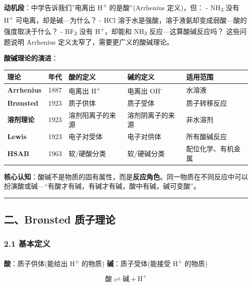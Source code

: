 \documentclass[a4paper,11pt]{ctexart}
\newcounter{none}
\begin{document}
\textbf{动机段}：中学告诉我们''电离出 H\textsuperscript{+} 的是酸''(Arrhenius 定义)，但：
- NH\textsubscript{3} 没有 H\textsuperscript{+} 可电离，却是碱---为什么？
- HCl 溶于水是强酸，溶于液氨却变成弱酸---酸的强度取决于什么？
- BF\textsubscript{3} 没有 H\textsuperscript{+}，却能和 NH\textsubscript{3} 反应---这算酸碱反应吗？
这些问题说明 Arrhenius 定义太窄了，需要更广义的酸碱理论。

\textbf{酸碱理论的演进}：

{\def\LTcaptype{none} %
\begin{longtable}[]{@{}lclll@{}}
\toprule\noalign{}
理论 & 年代 & 酸的定义 & 碱的定义 & 适用范围 \\
\midrule\noalign{}
\endhead
\bottomrule\noalign{}
\endlastfoot
\textbf{Arrhenius} & 1887 & 电离出 H\textsuperscript{+} & 电离出 OH\textsuperscript{-} & 水溶液 \\
\textbf{Brønsted} & 1923 & 质子供体 & 质子受体 & 质子转移反应 \\
\textbf{溶剂理论} & 1923 & 溶剂阳离子的来源 & 溶剂阴离子的来源 & 非水溶剂 \\
\textbf{Lewis} & 1923 & 电子对受体 & 电子对供体 & 所有酸碱反应 \\
\textbf{HSAB} & 1963 & 软/硬酸分类 & 软/硬碱分类 & 配位化学、有机金属 \\
\end{longtable}
}

\textbf{核心认知}：酸碱不是物质的固有属性，而是\textbf{反应角色}。同一物质在不同反应中可以扮演酸或碱---``有酸才有碱，有碱才有碱，酸中有碱，碱可变酸''。

\begin{center}\rule{0.5\linewidth}{0.5pt}\end{center}

\subsection{二、Brønsted 质子理论}\label{ux4e8cbruxf8nsted-ux8d28ux5b50ux7406ux8bba}

\subsubsection{2.1 基本定义}\label{ux57faux672cux5b9aux4e49}

\textbf{酸}：质子供体(能给出 H\textsuperscript{+} 的物质)
\textbf{碱}：质子受体(能接受 H\textsuperscript{+} 的物质)

\[
\text{酸} \rightleftharpoons \text{碱} + \mathrm{H}^+
\]
\end{document}
